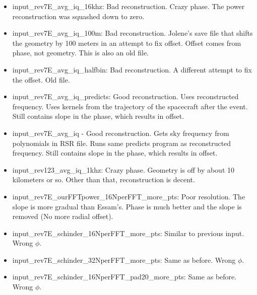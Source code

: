 \documentclass[crop=false,class=article,oneside]{standalone}
\begin{document}
\begin{enumerate}[leftmargin=55pt]
            \begin{itemize}
                \item input\_rev7E\_avg\_iq\_16khz: Bad reconstruction.
                      Crazy phase. The power reconstruction was squashed
                      down to zero.
                \item input\_rev7E\_avg\_iq\_100m: Bad reconstruction.
                      Jolene's save file that shifts the geometry by 100
                      meters in an attempt to fix offset. Offset comes
                      from phase, not geometry. This is also an old file.
                \item input\_rev7E\_avg\_iq\_halfbin: Bad reconstruction.
                      A different attempt to fix the offset. Old file.
                \item input\_rev7E\_avg\_iq\_predicts: Good reconstruction.
                      Uses reconstructed frequency. Uses kernels from the
                      trajectory of the spacecraft after the event. Still
                      contains slope in the phase, which results in offset.
                \item input\_rev7E\_avg\_iq - Good reconstruction.
                      Gets sky frequency from polynomials in RSR file.
                      Runs same predicts program as reconstructed frequency.
                      Still contains slope in the phase,
                      which results in offset.
                \item input\_rev123\_avg\_iq\_1khz: Crazy phase.
                      Geometry is off by about 10 kilometers or so.
                      Other than that, reconstruction is decent.
                \item input\_rev7E\_ourFFTpower\_16NperFFT\_more\_pts:
                      Poor resolution. The slope is more gradual than
                      Essam's. Phase is much better and the slope is
                      removed (No more radial offset). 
                \item input\_rev7E\_schinder\_16NperFFT\_more\_pts:
                      Similar to previous input. Wrong $\phi$.
                \item input\_rev7E\_schinder\_32NperFFT\_more\_pts:
                      Same as before. Wrong $\phi$.
                \item input\_rev7E\_schinder\_16NperFFT\_pad20\_more\_pts:
                      Same as before. Wrong $\phi$.
            \end{itemize}

\end{enumerate}
\end{document}
